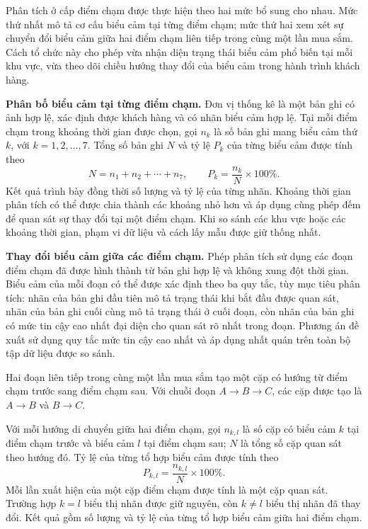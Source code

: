 \documentclass[../LuanVan.tex]{subfiles}
\begin{document}
Phân tích ở cấp điểm chạm được thực hiện theo hai mức bổ sung cho nhau. Mức thứ nhất mô tả cơ cấu biểu cảm tại từng điểm chạm; mức thứ hai xem xét sự chuyển đổi biểu cảm giữa hai điểm chạm liên tiếp trong cùng một lần mua sắm. Cách tổ chức này cho phép vừa nhận diện trạng thái biểu cảm phổ biến tại mỗi khu vực, vừa theo dõi chiều hướng thay đổi của biểu cảm trong hành trình khách hàng.

\noindent\textbf{Phân bố biểu cảm tại từng điểm chạm.}
Đơn vị thống kê là một bản ghi có ảnh hợp lệ, xác định được khách hàng và có nhãn biểu cảm hợp lệ. Tại mỗi điểm chạm trong khoảng thời gian được chọn, gọi $n_k$ là số bản ghi mang biểu cảm thứ $k$, với $k=1,2,\ldots,7$. Tổng số bản ghi $N$ và tỷ lệ $P_k$ của từng biểu cảm được tính theo
\begin{equation}
    N=n_1+n_2+\cdots+n_7,
    \qquad P_k=\frac{n_k}{N}\times100\%.
    \label{eq:ch3_distribution}
\end{equation}
Kết quả trình bày đồng thời số lượng và tỷ lệ của từng nhãn. Khoảng thời gian phân tích có thể được chia thành các khoảng nhỏ hơn và áp dụng cùng phép đếm để quan sát sự thay đổi tại một điểm chạm. Khi so sánh các khu vực hoặc các khoảng thời gian, phạm vi dữ liệu và cách lấy mẫu được giữ thống nhất.

\noindent\textbf{Thay đổi biểu cảm giữa các điểm chạm.}
Phép phân tích sử dụng các đoạn điểm chạm đã được hình thành từ bản ghi hợp lệ và không xung đột thời gian. Biểu cảm của mỗi đoạn có thể được xác định theo ba quy tắc, tùy mục tiêu phân tích: nhãn của bản ghi đầu tiên mô tả trạng thái khi bắt đầu được quan sát, nhãn của bản ghi cuối cùng mô tả trạng thái ở cuối đoạn, còn nhãn của bản ghi có mức tin cậy cao nhất đại diện cho quan sát rõ nhất trong đoạn. Phương án đề xuất sử dụng quy tắc mức tin cậy cao nhất và áp dụng nhất quán trên toàn bộ tập dữ liệu được so sánh.

Hai đoạn liên tiếp trong cùng một lần mua sắm tạo một cặp có hướng từ điểm chạm trước sang điểm chạm sau. Với chuỗi đoạn $A\rightarrow B\rightarrow C$, các cặp được tạo là $A\rightarrow B$ và $B\rightarrow C$.

Với mỗi hướng di chuyển giữa hai điểm chạm, gọi $n_{k,l}$ là số cặp có biểu cảm $k$ tại điểm chạm trước và biểu cảm $l$ tại điểm chạm sau; $N$ là tổng số cặp quan sát theo hướng đó. Tỷ lệ của từng tổ hợp biểu cảm được tính theo
\begin{equation}
    P_{k,l}=\frac{n_{k,l}}{N}\times100\%.
    \label{eq:ch3_pair_distribution}
\end{equation}
Mỗi lần xuất hiện của một cặp điểm chạm được tính là một cặp quan sát. Trường hợp $k=l$ biểu thị nhãn được giữ nguyên, còn $k\ne l$ biểu thị nhãn đã thay đổi. Kết quả gồm số lượng và tỷ lệ của từng tổ hợp biểu cảm giữa hai điểm chạm.
\end{document}
